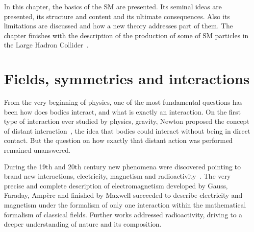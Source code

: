 In this chapter, the basics of the SM are presented. Its seminal ideas are presented, its structure and content and its ultimate consequences. Also its limitations are discussed and how a new theory addresses part of them. The chapter finishes with the description of the production of some of SM particles in the Large Hadron Collider~\cite{1748-0221-3-08-S08001}. 

\section{Fields, symmetries and interactions}
\label{sec:symm}

From the very beginning of physics, one of the most fundamental questions has been how does bodies interact, and what is exactly an interaction. On the first type of interaction ever studied by physics, gravity, Newton proposed the concept of distant interaction~\cite{Newton:2014}, the idea that bodies could interact without being in direct contact. But the question on how exactly that distant action was performed remained unanswered. 

During the 19th and 20th century new phenomena were discovered pointing to brand new interactions, electricity, magnetism and radioactivity~\cite{Pauli:1930pc}. The very precise and complete description of electromagnetism developed by Gauss, Faraday, Amp\`{e}re and finished by Maxwell succeeded to describe electricity and magnetism under the formalism of only one interaction within the mathematical formalism of classical fields. Further works addressed radioactivity, driving to a deeper understanding of nature and its composition.


